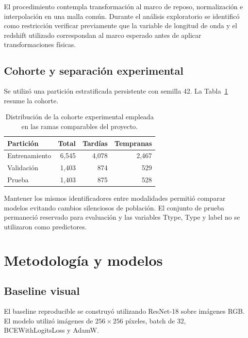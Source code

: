 \documentclass[letterpaper,11pt]{article}
\begin{document}
El procedimiento contempla transformación al marco de reposo, normalización e interpolación en una malla común. Durante el análisis exploratorio se identificó como restricción verificar previamente que la variable de longitud de onda y el redshift utilizado correspondan al marco esperado antes de aplicar transformaciones físicas.

\subsection{Cohorte y separación experimental} 

Se utilizó una partición estratificada persistente con semilla 42. La Tabla~\ref{tab:cohorte} resume la cohorte.

\begin{table}[H] 
  \centering 
  \caption{Distribución de la cohorte experimental empleada en las ramas comparables del proyecto.} 
  \label{tab:cohorte}

  \begin{tabular}{lrrr} 
    \toprule 
    Partición & Total & Tardías & Tempranas\\ 
    \midrule 
    Entrenamiento & 6,545 & 4,078 & 2,467\\ 
    Validación & 1,403 & 874 & 529\\ 
    Prueba & 1,403 & 875 & 528\\ 
    \bottomrule 
  \end{tabular} 

\end{table}

Mantener los mismos identificadores entre modalidades permitió comparar modelos evitando cambios silenciosos de población. El conjunto de prueba permaneció reservado para evaluación y las variables Ttype, Type y label no se utilizaron como predictores.

\section{Metodología y modelos} 
\subsection{Baseline visual} 

El baseline reproducible se construyó utilizando ResNet-18 sobre imágenes RGB. El modelo utilizó imágenes de $256\times256$ píxeles, batch de 32, BCEWithLogitsLoss y AdamW. 
\end{document}
